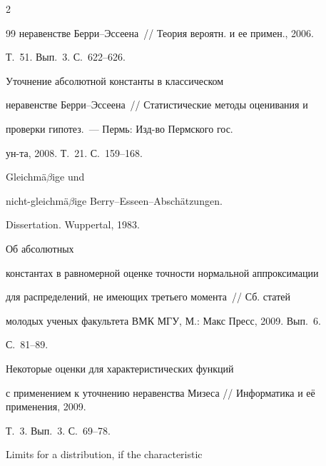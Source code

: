\begin{multicols}{2}
{{\begin{thebibliography}{99}
неравенстве Берри--Эссеена~// Теория вероятн. и ее примен., 2006.


Т.~51. Вып.~3. С.~622--626.







 Уточнение абсолютной константы в классическом


неравенстве Берри--Эссеена~// Статистические методы оценивания и


проверки гипотез.~--- Пермь: Изд-во Пермского гос.


ун-та, 2008. Т.~21. С.~159--168.







 Gleichm{\"a}$\beta$ige und


nicht-gleichm{\"a}$\beta$ige Berry--Esseen--Absch{\"a}tzungen.


Dissertation. Wuppertal, 1983.









Об абсолютных


константах в равномерной оценке точности нормальной аппроксимации


для распределений, не имеющих третьего момента~// Сб. статей


молодых ученых факультета ВМК МГУ, М.: Макс Пресс, 2009. Вып.~6.


С.~81--89.







 Некоторые оценки для характеристических функций


с применением к уточнению неравенства Мизеса // Информатика и её применения, 2009.


Т.~3. Вып.~3. С.~69--78.





\label{end\stat}







 Limits for a distribution, if the characteristic



\end{thebibliography}}}
\end{multicols}
